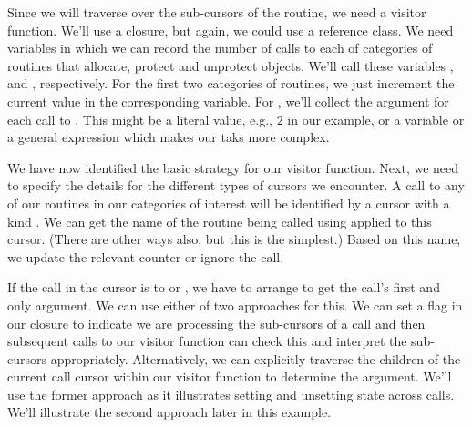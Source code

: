 Since we will traverse over the sub-cursors of the routine, we need a
visitor function. We'll use a closure, but again, we could use a
reference class.  We need variables in which we can record the number
of calls to each of categories of routines that allocate, protect and
unprotect objects.  We'll call these variables ,
 and , respectively.
For the first two categories of routines, we just increment the
current value in the corresponding \R{} variable.  For
, we'll collect the argument for each call to
. This might be a literal value, e.g., $2$ in our
example, or a variable or a general expression which makes our taks
more complex.

We have now identified the basic strategy for our visitor function.
Next, we need to specify the details for the different types of
cursors we encounter. A call to any of our routines in our categories
of interest will be identified by a cursor with a kind
.  We can get the name of the routine being
called using  applied to this cursor. (There are other
ways also, but this is the simplest.)  Based on this name, we update
the relevant counter or ignore the call. 

If the call in the cursor is to  or
, we have to arrange to get the call's first and only
argument.  We can use either of two approaches for this.  We can set a
flag in our closure to indicate we are processing the sub-cursors of a
 call and then subsequent calls to our visitor
function can check this and interpret the sub-cursors
appropriately. Alternatively, we can explicitly traverse the children
of the current call cursor within our visitor function to determine
the argument.  We'll use the former approach as it illustrates setting
and unsetting state across calls. We'll illustrate the second approach
later in this example.

